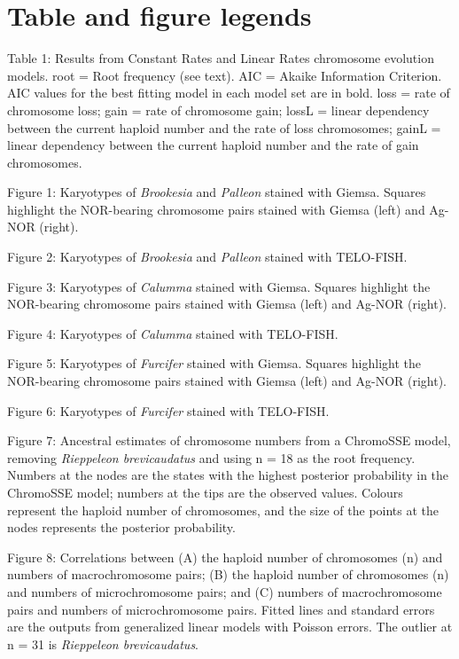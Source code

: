 \documentclass[a4paper, 12pt]{article}
\begin{document}
\newpage
\section{Table and figure legends}

Table 1: Results from Constant Rates and Linear Rates chromosome evolution models. root = Root frequency (see text). AIC = Akaike Information Criterion. AIC values for the best fitting model in each model set are in bold. loss = rate of chromosome loss; gain = rate of chromosome gain; lossL = linear dependency between the current haploid number and the rate of loss chromosomes; gainL = linear dependency between the current haploid number and the rate of gain chromosomes.

Figure 1: Karyotypes of \textit{Brookesia} and \textit{Palleon} stained with Giemsa. Squares highlight the NOR-bearing chromosome pairs stained with Giemsa (left) and Ag-NOR (right).

Figure 2: Karyotypes of \textit{Brookesia} and \textit{Palleon} stained with TELO-FISH.

Figure 3: Karyotypes of \textit{Calumma} stained with Giemsa. Squares highlight the NOR-bearing chromosome pairs stained with Giemsa (left) and Ag-NOR (right).

Figure 4: Karyotypes of \textit{Calumma} stained with TELO-FISH.

Figure 5: Karyotypes of \textit{Furcifer} stained with Giemsa. Squares highlight the NOR-bearing chromosome pairs stained with Giemsa (left) and Ag-NOR (right).

Figure 6: Karyotypes of \textit{Furcifer} stained with TELO-FISH.

Figure 7: Ancestral estimates of chromosome numbers from a ChromoSSE model, removing \textit{Rieppeleon brevicaudatus} and using n = 18 as the root frequency. Numbers at the nodes are the states with the highest posterior probability in the ChromoSSE model; numbers at the tips are the observed values. Colours represent the haploid number of chromosomes, and the size of the points at the nodes represents the posterior probability.

Figure 8: Correlations between (A) the haploid number of chromosomes (n) and numbers of macrochromosome pairs; (B) the haploid number of chromosomes (n) and numbers of microchromosome pairs; and (C) numbers of macrochromosome pairs and numbers of microchromosome pairs. Fitted lines and standard errors are the outputs from generalized linear models with Poisson errors. The outlier at n = 31 is \textit{Rieppeleon brevicaudatus}.
\end{document}

